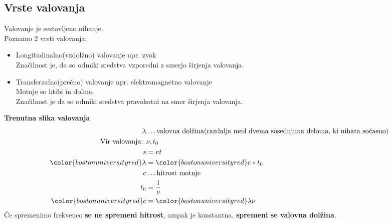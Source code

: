 {\color{indiagreen}\subsection{Vrste valovanja}}
Valovanje je sestavljeno nihanje.\\
Poznamo 2 vrsti valovanja:
\begin{itemize}
	\item Longitudinalno(vzdolžno) valovanje npr. zvok\\
		Značilnost je, da so odmiki sredstva vzporedni z smerjo širjenja valovanja.
	\item Transferzalno(prečno) valovanje npr. elektromagnetno valovanje\\
		Motnje so htibi in doline.\\
		Značilnost je da so odmiki sredstva pravokotni na smer širjenja valovanja.
\end{itemize}

\textbf{Trenutna slika valovanja}
\begin{align*}
	\lambda &\dots \text{valovna dolžina(razdalja med dvema sosednjima deloma, ki nihata sočasno)}\\
	\text{Vir valovanja: } & \nu, t_0\\
	s &= vt\\
	{\color{bostonuniversityred}\lambda} &= {\color{bostonuniversityred}c * t_0}\\
	c &\dots \text{hitrost motnje}\\
	t_0 &= \frac{1}{\nu}\\
	{\color{bostonuniversityred}c} &= {\color{bostonuniversityred}\lambda \nu}\\
\end{align*}
Če spremenimo frekvenco \textbf{se ne spremeni hitrost}, ampak je konstantna, \textbf{spremeni se valovna dolžina}.
